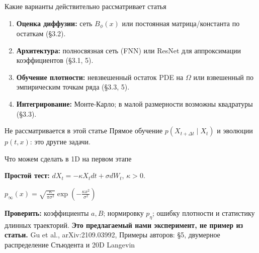 \documentclass[10pt,aspectratio=169]{beamer}
\newcommand{\src}[1]{\vfill{\tiny\color{graytext}Gu et al., arXiv:2109.03992, #1}}
\begin{document}
\begin{frame}{Какие варианты действительно рассматривает статья}
\vspace{0.08cm}
\begin{enumerate}\setlength\itemsep{0.28cm}
\item \textbf{Оценка диффузии:} сеть $B_\phi(x)$ или постоянная матрица/константа по остаткам (\S 3.2).
\item \textbf{Архитектура:} полносвязная сеть (FNN) или ResNet для аппроксимации коэффициентов (\S 3.1, 5).
\item \textbf{Обучение плотности:} невзвешенный остаток PDE на $\Omega$ или взвешенный по эмпирическим точкам ряда (\S 3.3, 5).
\item \textbf{Интегрирование:} Монте-Карло; в малой размерности возможны квадратуры (\S 3.3).
\end{enumerate}
\vspace{0.18cm}
\begin{block}{Не рассматривается в этой статье}
Прямое обучение $p(X_{t+\Delta t}\mid X_t)$ и эволюции $p(t,x)$: это другие задачи.
\end{block}
\end{frame}

\begin{frame}{Что можем сделать в 1D на первом этапе}
\vspace{0.17cm}
\begin{center}
\end{center}
\vspace{0.2cm}
\textbf{Простой тест:} $dX_t=-\kappa X_tdt+\sigma dW_t$, $\kappa>0$.
\begin{center}
$\displaystyle p_\infty(x)=\sqrt{\frac{\kappa}{\pi\sigma^2}}\exp\!\left(-\frac{\kappa x^2}{\sigma^2}\right)$
\end{center}
\vspace{0.08cm}
\textbf{Проверить:} коэффициенты $a,B$; нормировку $p_\eta$; ошибку плотности и статистику длинных траекторий.
\vspace{0.1cm}
{\small\color{teal}\bfseries Это предлагаемый нами эксперимент, не пример из статьи.}
\src{Примеры авторов: \S 5, двумерное распределение Стьюдента и 20D Langevin}
\end{frame}
\end{document}
